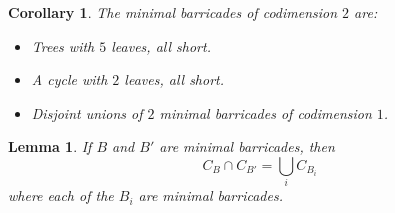 \documentclass{amsart}
\newtheorem{corollary}[proposition]{Corollary}
\newtheorem{lemma}[proposition]{Lemma}
\theoremstyle{definition}
\theoremstyle{remark}
\numberwithin{equation}{section}
\newcommand{\0}{{\mathbf{0}}}
\begin{document}
\begin{corollary}
The minimal barricades of codimension $2$ are:
\begin{itemize}
	\item Trees with $5$ leaves, all short.
	\item A cycle with $2$ leaves, all short.
	\item Disjoint unions of $2$ minimal barricades of codimension $1$.
\end{itemize}
\end{corollary}

\begin{lemma}
If $B$ and $B'$ are minimal barricades, then 
\[ C_B\cap C_{B'} = \bigcup _i C_{B_i} \]
where each of the $B_i$ are minimal barricades. 
\end{lemma}
\end{document}
